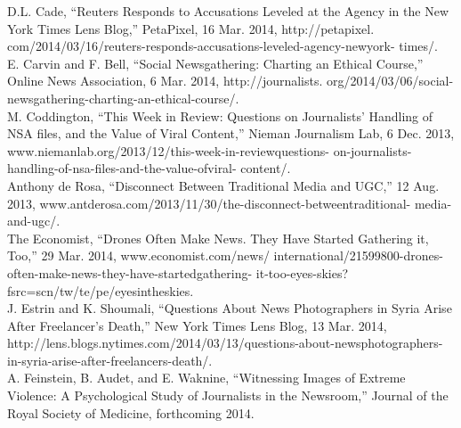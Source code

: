 \begin{enumerate}
D.L. Cade, ``Reuters Responds to Accusations Leveled at the Agency in
the New York Times Lens Blog,'' PetaPixel, 16 Mar. 2014, http://petapixel.
com/2014/03/16/reuters-responds-accusations-leveled-agency-newyork-
times/.\\
E. Carvin and F. Bell, ``Social Newsgathering: Charting an Ethical
Course,'' Online News Association, 6 Mar. 2014, http://journalists.
org/2014/03/06/social-newsgathering-charting-an-ethical-course/.\\
M. Coddington, ``This Week in Review: Questions on Journalists'
Handling of NSA files, and the Value of Viral Content,'' Nieman Journalism
Lab, 6 Dec. 2013, www.niemanlab.org/2013/12/this-week-in-reviewquestions-
on-journalists-handling-of-nsa-files-and-the-value-ofviral-
content/.\\
Anthony de Rosa, ``Disconnect Between Traditional Media and UGC,'' 12
Aug. 2013, www.antderosa.com/2013/11/30/the-disconnect-betweentraditional-
media-and-ugc/.\\
The Economist, ``Drones Often Make News. They Have Started
Gathering it, Too,'' 29 Mar. 2014, www.economist.com/news/
international/21599800-drones-often-make-news-they-have-startedgathering-
it-too-eyes-skies?fsrc=scn/tw/te/pe/eyesintheskies.\\
J. Estrin and K. Shoumali, ``Questions About News Photographers in Syria
Arise After Freelancer's Death,'' New York Times Lens Blog, 13 Mar. 2014,
http://lens.blogs.nytimes.com/2014/03/13/questions-about-newsphotographers-
in-syria-arise-after-freelancers-death/.\\
A. Feinstein, B. Audet, and E. Waknine, ``Witnessing Images of Extreme
Violence: A Psychological Study of Journalists in the Newsroom,'' Journal
of the Royal Society of Medicine, forthcoming 2014.\\


\end{enumerate}
